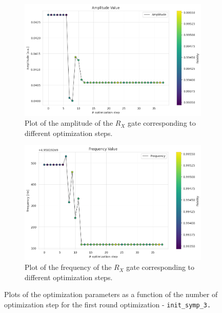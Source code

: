 \begin{figure}[h!]
    \centering
    \begin{subfigure}[t]{0.45\textwidth}
        \includegraphics[width=\textwidth]{figures/png/RB_optimization/NM/InitialSymplex/20241113_200745/Amplitude.png}
        \caption{Plot of the amplitude of the $R_X$ gate corresponding to different optimization steps.}
        \label{fig:20241113_200745:amplitude}
    \end{subfigure}
    \hfill
    \begin{subfigure}[t]{0.45\textwidth}
        \includegraphics[width=\textwidth]{figures/png/RB_optimization/NM/InitialSymplex/20241113_200745/Frequency.png}
        \caption{Plot of the frequency of the $R_X$ gate corresponding to different optimization steps.}
        \label{fig:20241113_200745:frequency}
    \end{subfigure}
    \caption{Plots of the optimization parameters as a function of the number of optimization step for the first round optimization - \tt{init\_symp\_3}.}
    \label{fig:20241113_200745:parameters}
\end{figure}

